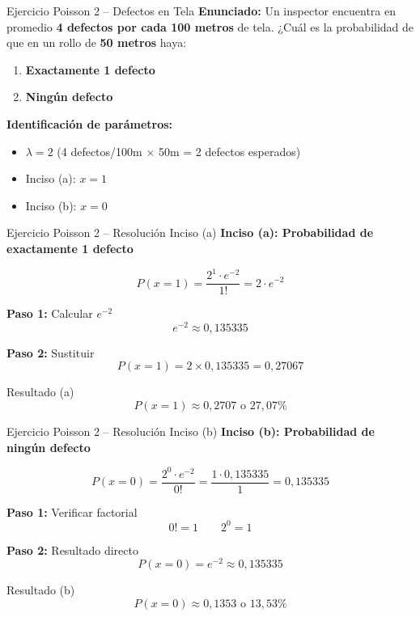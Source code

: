 \documentclass[10pt]{beamer}
\begin{document}
\begin{frame}{Ejercicio Poisson 2 -- Defectos en Tela}
\textbf{Enunciado:}
\justifying
Un inspector encuentra en promedio \textbf{4 defectos por cada 100 metros} de tela. ¿Cuál es la probabilidad de que en un rollo de \textbf{50 metros} haya:

\begin{enumerate}
    \item[(a)] \textbf{Exactamente 1 defecto}
    \item[(b)] \textbf{Ningún defecto}
\end{enumerate}

\vspace{0.2cm}
\textbf{Identificación de parámetros:}
\begin{itemize}
    \item $\lambda = 2$ (4 defectos/100m $\times$ 50m = 2 defectos esperados)
    \item Inciso (a): $x = 1$
    \item Inciso (b): $x = 0$
\end{itemize}
\end{frame}

\begin{frame}{Ejercicio Poisson 2 -- Resolución Inciso (a)}
\textbf{Inciso (a): Probabilidad de exactamente 1 defecto}

\[
P(x=1) = \frac{2^{1} \cdot e^{-2}}{1!} = 2 \cdot e^{-2}
\]

\textbf{Paso 1:} Calcular $e^{-2}$
\[
e^{-2} \approx 0,135335
\]

\textbf{Paso 2:} Sustituir
\[
P(x=1) = 2 \times 0,135335 = 0,27067
\]

\begin{block}{Resultado (a)}
\[
\boxed{P(x=1) \approx 0,2707 \text{ o } 27,07\%}
\]
\end{block}
\end{frame}

\begin{frame}{Ejercicio Poisson 2 -- Resolución Inciso (b)}
\textbf{Inciso (b): Probabilidad de ningún defecto}

\[
P(x=0) = \frac{2^{0} \cdot e^{-2}}{0!} = \frac{1 \cdot 0,135335}{1} = 0,135335
\]

\textbf{Paso 1:} Verificar factorial
\[
0! = 1 \qquad 2^{0} = 1
\]

\textbf{Paso 2:} Resultado directo
\[
P(x=0) = e^{-2} \approx 0,135335
\]

\begin{block}{Resultado (b)}
\[
\boxed{P(x=0) \approx 0,1353 \text{ o } 13,53\%}
\]
\end{block}
\end{frame}
\end{document}
